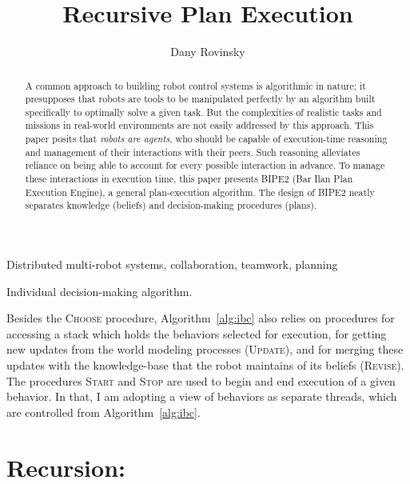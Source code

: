 \documentclass[3p,times]{elsarticle} %
\newcommand{\noun}[1]{\textsc{#1}}
\begin{document}
\begin{frontmatter}
\title{Recursive Plan Execution}
\author{Dany Rovinsky}
\address{Computer Science Department\\
Bar Ilan University, Israel}

\begin{keyword}
Distributed multi-robot systems, collaboration, teamwork, planning
\end{keyword}

\begin{abstract}
A common approach to building robot control systems
is algorithmic in nature; it presupposes that robots are tools to be manipulated perfectly by
an algorithm built specifically to optimally solve a given task. But the complexities of realistic tasks and missions
in real-world environments are not easily addressed
by this approach.  This paper posits that \emph{robots are agents}, who should be capable of execution-time
reasoning and management of their interactions with their peers. Such reasoning alleviates reliance
on being able to account for every possible interaction in advance.  To manage these interactions
in execution time, this paper presents BIPE2 (Bar Ilan Plan Execution Engine), a general plan-execution 
algorithm. The design of BIPE2 neatly separates knowledge (beliefs) and decision-making procedures (plans).
\end{abstract}

\end{frontmatter}

\begin{algorithm}[htbp]
\caption{Individual decision-making algorithm.}
\label{alg:ibc}

\end{algorithm}

Besides the \noun{Choose} procedure, Algorithm~\ref{alg:ibc} also relies on procedures for accessing a stack
which holds the behaviors selected for execution, for getting new updates from the world modeling processes
(\noun{Update}), and for merging these updates with the knowledge-base that the robot maintains of its
beliefs (\noun{Revise}).  The procedures \noun{Start} and \noun{Stop} are used to begin and end
execution of a given behavior. In that, I am adopting a view of behaviors as separate threads,
which are controlled from Algorithm~\ref{alg:ibc}.

\section{Recursion:}
\end{document}
